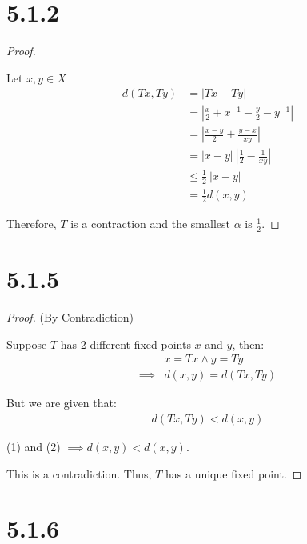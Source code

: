 \documentclass{article}
\begin{document}
\newpage

\section*{5.1.2}
\begin{proof}
  $ $

  Let $x,y \in X$
  \begin{align*}
    d(Tx, Ty) 
    &= |Tx - Ty| \\
    &= |\frac{x}{2} + x^{-1} - \frac{y}{2} - y^{-1}| \\
    &= |\frac{x-y}{2} + \frac{y-x}{xy}| \\
    &= |x-y| \: |\frac{1}{2} - \frac{1}{xy}| \\
    &\leq \frac{1}{2} \: |x-y| \\
    &= \frac{1}{2} d(x,y)
  \end{align*}

  Therefore, $T$ is a contraction and the smallest $\alpha$ is $\frac{1}{2}$.

\end{proof}

\section*{5.1.5}
\setcounter{equation}{0}
\begin{proof} (By Contradiction)
  $ $

  Suppose $T$ has 2 different fixed points $x$ and $y$, then:
  \begin{align}
    & x = Tx \land y = Ty \nonumber \\
    \implies& d(x, y) = d(Tx, Ty) 
  \end{align}

  But we are given that:
  \begin{align}
    d(Tx, Ty) < d(x, y)
  \end{align}

  (1) and (2) $\implies d(x,y) < d(x,y)$.
  \newline

  This is a contradiction. Thus, $T$ has a unique fixed point.

\end{proof}


\section*{5.1.6}
\setcounter{equation}{0}
\end{document}
